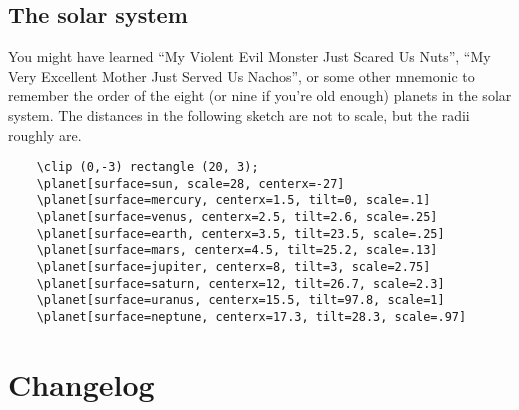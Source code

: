 \documentclass[12pt, twocolumn]{article}
\begin{document}
\subsection{The solar system}
You might have learned ``My Violent Evil Monster Just Scared Us Nuts'', ``My Very Excellent Mother Just Served Us Nachos'', or some other mnemonic to remember the order of the eight (or nine if you're old enough) planets in the solar system. 
The distances in the following sketch are not to scale, but the radii roughly are.

\begin{verbatim}
	\clip (0,-3) rectangle (20, 3);
	\planet[surface=sun, scale=28, centerx=-27]
	\planet[surface=mercury, centerx=1.5, tilt=0, scale=.1]
	\planet[surface=venus, centerx=2.5, tilt=2.6, scale=.25]
	\planet[surface=earth, centerx=3.5, tilt=23.5, scale=.25]
	\planet[surface=mars, centerx=4.5, tilt=25.2, scale=.13]
	\planet[surface=jupiter, centerx=8, tilt=3, scale=2.75]
	\planet[surface=saturn, centerx=12, tilt=26.7, scale=2.3]
	\planet[surface=uranus, centerx=15.5, tilt=97.8, scale=1]
	\planet[surface=neptune, centerx=17.3, tilt=28.3, scale=.97]
\end{verbatim}

\twocolumn

\section{Changelog}
\end{document}

